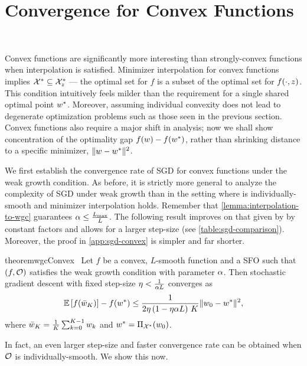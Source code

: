 \section{Convergence for Convex Functions}~\label{sec:sgd-convex}

Convex functions are significantly more interesting than strongly-convex functions when interpolation is satisfied. 
Minimizer interpolation for convex functions implies \( \calX^* \subseteq \calX^*_{\z} \) --- the optimal set for \( f \) is a subset of the optimal set for \( f(\cdot, \z) \).
This condition intuitively feels milder than the requirement for a single shared optimal point \( \wopt \). 
Moreover, assuming individual convexity does not lead to degenerate optimization problems such as those seen in the previous section.
Convex functions also require a major shift in analysis; now we shall show concentration of the optimality gap \( f(\w) - f(\wopt) \), rather than shrinking distance to a specific minimizer, \( \norm{\w - \wopt}^2 \).

We first establish the convergence rate of \ac{SGD} for convex functions under the weak growth condition. 
As before, it is strictly more general to analyze the complexity of \ac{SGD} under weak growth than in the setting where \oracle{} is individually-smooth and minimizer interpolation holds. 
Remember that \autoref{lemma:interpolation-to-wgc} guarantees \( \wgc \leq \frac{\Lmax}{L} \). 
The following result improves on that given by \citet{vaswani2019fast} by constant factors and allows for a larger step-size (see \autoref{table:sgd-comparison}).  
Moreover, the proof in \autoref{app:sgd-convex} is simpler and far shorter. 

\begin{restatable}{theorem}{wgcConvex}~\label{thm:wgc-convex}
    Let \( f \) be a convex, \( L \)-smooth function and \oracle{} a \ac{SFO} such that \( \rbr{f, \oracle{}} \) satisfies the weak growth condition with parameter \( \wgc \).
    Then stochastic gradient descent with fixed step-size \( \eta < \frac{1}{\wgc L} \) converges as
    \[ \E\sbr{\f(\bar \w_K)} - f(\wopt) \leq \frac{1}{2 \eta \rbr{1 - \eta \wgc L} \, K} \norm{\w_0 - \wopt}^2, \]
    where \( \bar \w_K = \frac{1}{K} \sum_{k=0}^{K-1} \wk \) and \( \wopt = \Pi_{\calX^*}(\w_0) \). 
\end{restatable}

\noindent In fact, an even larger step-size and faster convergence rate can be obtained when \( \oracle{} \) is individually-smooth.
We show this now.


